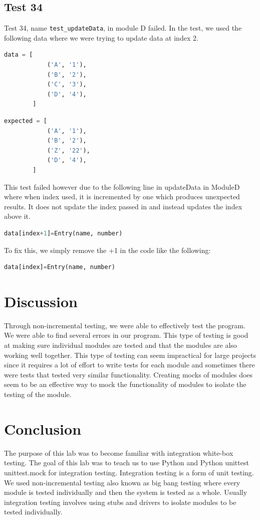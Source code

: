 \documentclass[12pt, letterpaper, titlepage]{article}
\begin{document}
\subsection{Test 34}
Test 34, name \lstinline{test_updateData}, in module D failed. In the test, we used the following data where we were trying to update data at index 2.
\begin{multicols}{2}
    \begin{lstlisting}[language=Python, style=style]
        data = [
            ('A', '1'),
            ('B', '2'),
            ('C', '3'),
            ('D', '4'),
        ]
    \end{lstlisting}

    \begin{lstlisting}[language=Python, style=style]
        expected = [
            ('A', '1'),
            ('B', '2'),
            ('Z', '22'),
            ('D', '4'),
        ]
    \end{lstlisting}
\end{multicols}
This test failed however due to the following line in updateData in ModuleD where when index used, it is incremented by one which produces unexpected results. It does not update the index passed in and instead updates the index above it.
\begin{lstlisting}[language=Python, style=style]
    data[index+1]=Entry(name, number)
\end{lstlisting}
To fix this, we simply remove the +1 in the code like the following:
\begin{lstlisting}[language=Python, style=style]
    data[index]=Entry(name, number)
\end{lstlisting}

\section{Discussion}
Through non-incremental testing, we were able to effectively test the program. We were able to find several errors in our program. This type of testing is good at making sure individual modules are tested and that the modules are also working well together. This type of testing can seem impractical for large projects since it requires a lot of effort to write tests for each module and sometimes there were tests that tested very similar functionality. Creating mocks of modules does seem to be an effective way to mock the functionality of modules to isolate the testing of the module.

\section{Conclusion}
The purpose of this lab was to become familiar with integration white-box testing. The goal of this lab was to teach us to use Python and Python unittest unittest.mock for integration testing. Integration testing is a form of unit testing. We used non-incremental testing also known as big bang testing where every module is tested individually and then the system is tested as a whole. Usually integration testing involves using stubs and drivers to isolate modules to be tested individually.
\end{document}
